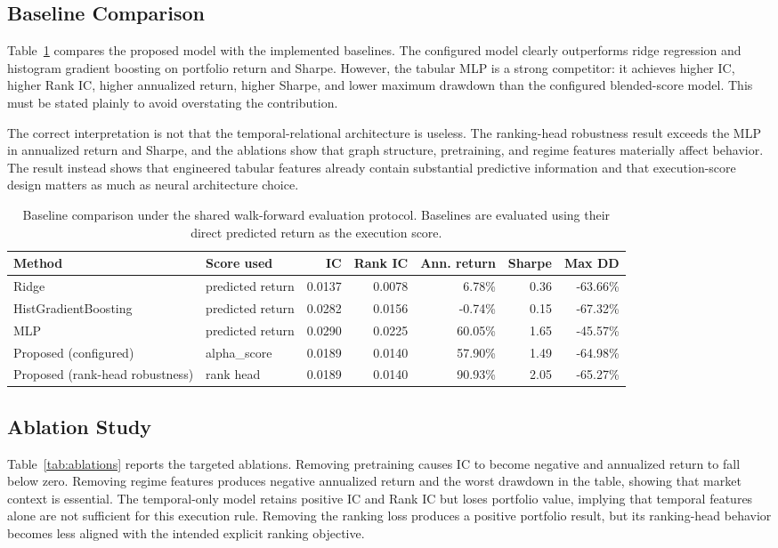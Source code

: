 \documentclass[conference]{IEEEtran}
\begin{document}
\subsection{Baseline Comparison}
Table~\ref{tab:baselines} compares the proposed model with the implemented baselines. The configured model clearly outperforms ridge regression and histogram gradient boosting on portfolio return and Sharpe. However, the tabular MLP is a strong competitor: it achieves higher IC, higher Rank IC, higher annualized return, higher Sharpe, and lower maximum drawdown than the configured blended-score model. This must be stated plainly to avoid overstating the contribution.

The correct interpretation is not that the temporal-relational architecture is useless. The ranking-head robustness result exceeds the MLP in annualized return and Sharpe, and the ablations show that graph structure, pretraining, and regime features materially affect behavior. The result instead shows that engineered tabular features already contain substantial predictive information and that execution-score design matters as much as neural architecture choice.

\begin{table}[t]
\centering
\caption{Baseline comparison under the shared walk-forward evaluation protocol. Baselines are evaluated using their direct predicted return as the execution score.}
\label{tab:baselines}
\footnotesize
\begin{tabular}{llrrrrr}
\toprule
Method & Score used & IC & Rank IC & Ann. return & Sharpe & Max DD \\
\midrule
Ridge & predicted return & 0.0137 & 0.0078 & 6.78\% & 0.36 & -63.66\% \\
HistGradientBoosting & predicted return & 0.0282 & 0.0156 & -0.74\% & 0.15 & -67.32\% \\
MLP & predicted return & 0.0290 & 0.0225 & 60.05\% & 1.65 & -45.57\% \\
Proposed (configured) & alpha\_score & 0.0189 & 0.0140 & 57.90\% & 1.49 & -64.98\% \\
Proposed (rank-head robustness) & rank head & 0.0189 & 0.0140 & 90.93\% & 2.05 & -65.27\% \\
\bottomrule
\end{tabular}
\end{table}

\subsection{Ablation Study}
Table~\ref{tab:ablations} reports the targeted ablations. Removing pretraining causes IC to become negative and annualized return to fall below zero. Removing regime features produces negative annualized return and the worst drawdown in the table, showing that market context is essential. The temporal-only model retains positive IC and Rank IC but loses portfolio value, implying that temporal features alone are not sufficient for this execution rule. Removing the ranking loss produces a positive portfolio result, but its ranking-head behavior becomes less aligned with the intended explicit ranking objective.
\end{document}
